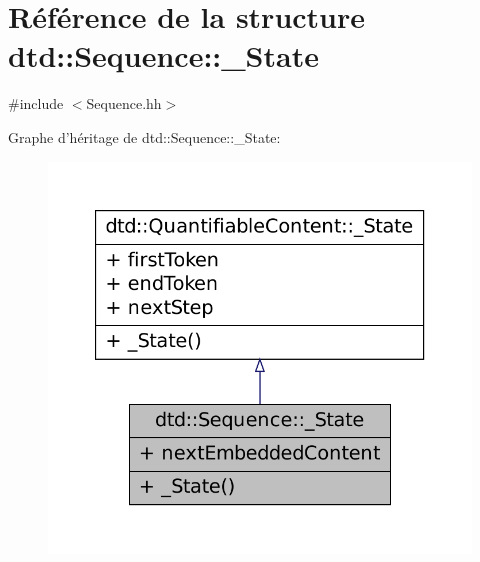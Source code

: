 \hypertarget{structdtd_1_1_sequence_1_1___state}{
\section{Référence de la structure dtd::Sequence::\_\-State}
\label{structdtd_1_1_sequence_1_1___state}
}


{\ttfamily \#include $<$Sequence.hh$>$}



Graphe d'héritage de dtd::Sequence::\_\-State:\nopagebreak
\begin{figure}[H]
\begin{center}
\leavevmode
\includegraphics[width=354pt]{structdtd_1_1_sequence_1_1___state__inherit__graph}
\end{center}
\end{figure}


